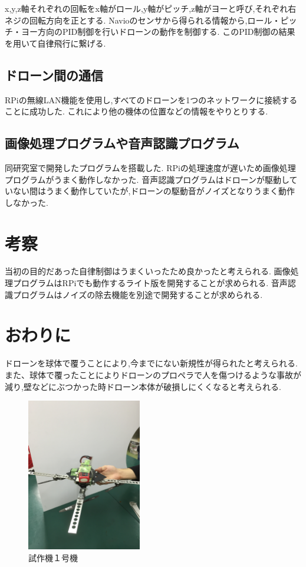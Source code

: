 \documentclass[a4paper]{jarticle}
\begin{document}
x,y,z軸それぞれの回転をx軸がロール,y軸がピッチ,z軸がヨーと呼び,それぞれ右ネジの回転方向を正とする.
Navioのセンサから得られる情報から,ロール・ピッチ・ヨー方向のPID制御を行いドローンの動作を制御する.
このPID制御の結果を用いて自律飛行に繋げる.



\subsection{ドローン間の通信}
RPiの無線LAN機能を使用し,すべてのドローンを1つのネットワークに接続することに成功した.
これにより他の機体の位置などの情報をやりとりする.

\subsection{画像処理プログラムや音声認識プログラム}
同研究室で開発したプログラムを搭載した.
RPiの処理速度が遅いため画像処理プログラムがうまく動作しなかった.
音声認識プログラムはドローンが駆動していない間はうまく動作していたが,ドローンの駆動音がノイズとなりうまく動作しなかった.


\section{考察}
当初の目的だあった自律制御はうまくいったため良かったと考えられる.
画像処理プログラムはRPiでも動作するライト版を開発することが求められる.
音声認識プログラムはノイズの除去機能を別途で開発することが求められる.

\section{おわりに}
ドローンを球体で覆うことにより,今までにない新規性が得られたと考えられる.
また、球体で覆ったことによりドローンのプロペラで人を傷つけるような事故が減り,壁などにぶつかった時ドローン本体が破損しにくくなると考えられる.




\begin{figure}[b]
 \begin{center}
  \includegraphics[width=50mm]{image/drone-1.JPG}
  \caption{試作機１号機}
  \label{fig:drone-1}
 \end{center}
\end{figure}
\end{document}
